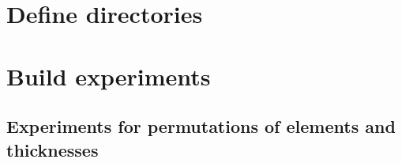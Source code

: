 \hypertarget{define-directories}{%
\section{Define directories}\label{define-directories}}

\begin{shaded}
\begin{Highlighting}[]
\NormalTok{)}

\OperatorTok{=} 
\OperatorTok{=} 
\end{Highlighting}
\end{shaded}

\begin{shaded}
\begin{Highlighting}[]
\OperatorTok{=}
\end{Highlighting}
\end{shaded}

\hypertarget{build-experiments}{%
\section{Build experiments}\label{build-experiments}}

\hypertarget{experiments-for-permutations-of-elements-and-thicknesses}{%
\subsection{Experiments for permutations of elements and
thicknesses}\label{experiments-for-permutations-of-elements-and-thicknesses}}

